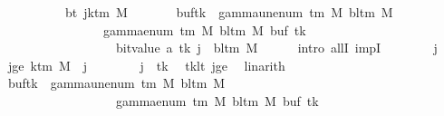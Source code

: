\begin{isabellebody}
\ \ \isamarkupfalse%
\ {\isacharminus}{\kern0pt}\isanewline
\ \ \ \ \isamarkupfalse%
\ bt{\isacharcolon}{\kern0pt}\ {\isachardoublequoteopen}{\isasymforall}j{\isasymge}k{\isacharunderscore}{\kern0pt}tm\ M{\isachardot}{\kern0pt}\isanewline
\ \ \ \ \ \ \ {\isacharparenleft}{\kern0pt}buf{\isacharparenleft}{\kern0pt}tk\ {\isacharcolon}{\kern0pt}{\isacharequal}{\kern0pt}\ gamma{\isacharunderscore}{\kern0pt}unenum\ {\isacharparenleft}{\kern0pt}{\isasymGamma}{\isacharunderscore}{\kern0pt}tm\ M{\isacharparenright}{\kern0pt}\ {\isacharparenleft}{\kern0pt}bl{\isacharunderscore}{\kern0pt}tm\ M{\isacharparenright}{\kern0pt}\isanewline
\ \ \ \ \ \ \ \ \ \ \ \ \ \ {\isacharparenleft}{\kern0pt}{}\ {\isacharasterisk}{\kern0pt}\ gamma{\isacharunderscore}{\kern0pt}enum\ {\isacharparenleft}{\kern0pt}{\isasymGamma}{\isacharunderscore}{\kern0pt}tm\ M{\isacharparenright}{\kern0pt}\ {\isacharparenleft}{\kern0pt}bl{\isacharunderscore}{\kern0pt}tm\ M{\isacharparenright}{\kern0pt}\ {\isacharparenleft}{\kern0pt}buf\ tk{\isacharparenright}{\kern0pt}\isanewline
\ \ \ \ \ \ \ \ \ \ \ \ \ \ \ \ \ {\isacharplus}{\kern0pt}\ bit{\isacharunderscore}{\kern0pt}value\ {\isacharparenleft}{\kern0pt}{\isacharquery}{\kern0pt}a\ tk{\isacharparenright}{\kern0pt}{\isacharparenright}{\kern0pt}{\isacharparenright}{\kern0pt}{\isacharparenright}{\kern0pt}\ j\ {\isacharequal}{\kern0pt}\ bl{\isacharunderscore}{\kern0pt}tm\ M{\isachardoublequoteclose}\isanewline
\ \ \ \ \isamarkupfalse%
\ {\isacharparenleft}{\kern0pt}intro\ allI\ impI{\isacharparenright}{\kern0pt}\isanewline
\ \ \ \ \ \ \isamarkupfalse%
\ j\ \isamarkupfalse%
\ jge{\isacharcolon}{\kern0pt}\ {\isachardoublequoteopen}k{\isacharunderscore}{\kern0pt}tm\ M\ {\isasymle}\ j{\isachardoublequoteclose}\isanewline
\ \ \ \ \ \ \isamarkupfalse%
\ {\isachardoublequoteopen}j\ {\isasymnoteq}\ tk{\isachardoublequoteclose}\ \isamarkupfalse%
\ tk{\isacharunderscore}{\kern0pt}lt\ jge\ \isamarkupfalse%
\ linarith\isanewline
\ \ \ \ \ \ \isamarkupfalse%
\ {\isachardoublequoteopen}{\isacharparenleft}{\kern0pt}buf{\isacharparenleft}{\kern0pt}tk\ {\isacharcolon}{\kern0pt}{\isacharequal}{\kern0pt}\ gamma{\isacharunderscore}{\kern0pt}unenum\ {\isacharparenleft}{\kern0pt}{\isasymGamma}{\isacharunderscore}{\kern0pt}tm\ M{\isacharparenright}{\kern0pt}\ {\isacharparenleft}{\kern0pt}bl{\isacharunderscore}{\kern0pt}tm\ M{\isacharparenright}{\kern0pt}\isanewline
\ \ \ \ \ \ \ \ \ \ \ \ \ \ \ \ {\isacharparenleft}{\kern0pt}{}\ {\isacharasterisk}{\kern0pt}\ gamma{\isacharunderscore}{\kern0pt}enum\ {\isacharparenleft}{\kern0pt}{\isasymGamma}{\isacharunderscore}{\kern0pt}tm\ M{\isacharparenright}{\kern0pt}\ {\isacharparenleft}{\kern0pt}bl{\isacharunderscore}{\kern0pt}tm\ M{\isacharparenright}{\kern0pt}\ {\isacharparenleft}{\kern0pt}buf\ tk{\isacharparenright}{\kern0pt}\isanewline

\end{isabellebody}
